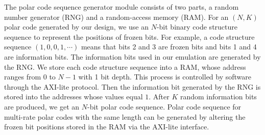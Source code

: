 \documentclass{article}
\begin{document}
The polar code sequence generator module consists of two parts, a random number generator (RNG) and a random-access memory (RAM). For an $(N, K)$ polar code generated by our design, we use an $N$-bit binary code structure sequence to represent the positions of frozen bits. For example, a code structure sequence $(1,0,0,1,\cdots)$ means that bits 2 and 3 are frozen bits and bits 1 and 4 are information bits. The information bits used in our emulation are generated by the RNG. 
We store each code structure sequence into a RAM, whose address ranges from $0$ to $N-1$ with 1 bit depth. This process is controlled by software through the AXI-lite protocol. Then the information bit generated by the RNG is stored into the addresses whose values equal $1$. After $K$ random information bits are produced, we get an $N$-bit polar code sequence. Polar code sequence for multi-rate polar codes with the same length can be generated by altering the frozen bit positions stored in the RAM via the AXI-lite interface.

\end{document}
